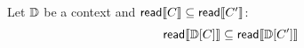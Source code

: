 



\begin{lemma}%
  Let $\mathbb{D}$ be a context
and ${\mathsf{read}}\llbracket C\rrbracket \subseteq {\mathsf{read}}\llbracket C'\rrbracket$:
\begin{displaymath}
  \readc\sem{\bCtxt\hole{\aCmd}} \subseteq \readc\sem{\bCtxt\hole{\aCmd'}}
\end{displaymath}
\end{lemma}
